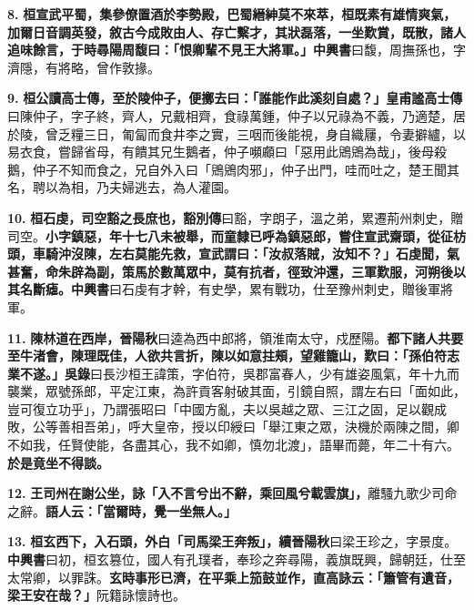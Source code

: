 \textbf{8.} \textbf{桓宣武平蜀，集參僚置酒於李勢殿，巴蜀縉紳莫不來萃，桓既素有雄情爽氣，加爾日音調英發，敘古今成敗由人、存亡繫才，其狀磊落，一坐歎賞，既散，諸人追味餘言，于時尋陽周馥曰：「恨卿輩不見王大將軍。」}{\footnotesize \textbf{中興書}曰馥，周撫孫也，字濟隱，有將略，曾作敦掾。}

\textbf{9.} \textbf{桓公讀高士傳，至於陵仲子，便擲去曰：「誰能作此溪刻自處？」}{\footnotesize \textbf{皇甫謐高士傳}曰陳仲子，字子終，齊人，兄戴相齊，食祿萬鍾，仲子以兄祿為不義，乃適楚，居於陵，曾乏糧三日，匍匐而食井李之實，三咽而後能視，身自織屨，令妻擗纑，以易衣食，嘗歸省母，有饋其兄生鵝者，仲子嚬顣曰「惡用此鶂鶂為哉」，後母殺鵝，仲子不知而食之，兄自外入曰「鶂鶂肉邪」，仲子出門，哇而吐之，楚王聞其名，聘以為相，乃夫婦逃去，為人灌園。}

\textbf{10.} \textbf{桓石虔，司空豁之長庶也，}{\footnotesize \textbf{豁別傳}曰豁，字朗子，溫之弟，累遷荊州刺史，贈司空。}\textbf{小字鎮惡，年十七八未被舉，而童隸已呼為鎮惡郎，嘗住宣武齋頭，從征枋頭，車騎沖沒陳，左右莫能先救，宣武謂曰：「汝叔落賊，汝知不？」石虔聞，氣甚奮，命朱辟為副，策馬於數萬眾中，莫有抗者，徑致沖還，三軍歎服，河朔後以其名斷瘧。}{\footnotesize \textbf{中興書}曰石虔有才幹，有史學，累有戰功，仕至豫州刺史，贈後軍將軍。}

\textbf{11.} \textbf{陳林道在西岸，}{\footnotesize \textbf{晉陽秋}曰逵為西中郎將，領淮南太守，戍歷陽。}\textbf{都下諸人共要至牛渚會，陳理既佳，人欲共言折，陳以如意拄頰，望雞籠山，歎曰：「孫伯符志業不遂。」}{\footnotesize \textbf{吳錄}曰長沙桓王諱策，字伯符，吳郡富春人，少有雄姿風氣，年十九而襲業，眾號孫郎，平定江東，為許貢客射破其面，引鏡自照，謂左右曰「面如此，豈可復立功乎」，乃謂張昭曰「中國方亂，夫以吳越之眾、三江之固，足以觀成敗，公等善相吾弟」，呼大皇帝，授以印綬曰「舉江東之眾，決機於兩陳之間，卿不如我，任賢使能，各盡其心，我不如卿，慎勿北渡」，語畢而薨，年二十有六。}\textbf{於是竟坐不得談。}

\textbf{12.} \textbf{王司州在謝公坐，詠「入不言兮出不辭，乘回風兮載雲旗」，}{\footnotesize 離騷九歌少司命之辭。}\textbf{語人云：「當爾時，覺一坐無人。」}

\textbf{13.} \textbf{桓玄西下，入石頭，外白「司馬梁王奔叛」，}{\footnotesize \textbf{續晉陽秋}曰梁王珍之，字景度。\textbf{中興書}曰初，桓玄篡位，國人有孔璞者，奉珍之奔尋陽，義旗既興，歸朝廷，仕至太常卿，以罪誅。}\textbf{玄時事形已濟，在平乘上笳鼓並作，直高詠云：「簫管有遺音，梁王安在哉？」}{\footnotesize 阮籍詠懷詩也。}